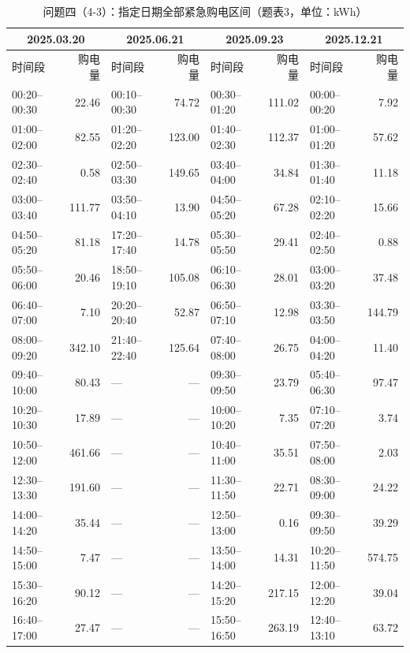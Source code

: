 \FloatBarrier
\begin{table}[H]
\centering\footnotesize
\setlength{\tabcolsep}{2.5pt}
\caption{问题四（4-3）：指定日期全部紧急购电区间（题表3，单位：kWh）}
\label{tab:required-q43-emergency}
\begin{tabular}{@{}lrlrlrlr@{}}
\toprule
\multicolumn{2}{c}{2025.03.20} & \multicolumn{2}{c}{2025.06.21} & \multicolumn{2}{c}{2025.09.23} & \multicolumn{2}{c}{2025.12.21} \\
\midrule
时间段 & 购电量 & 时间段 & 购电量 & 时间段 & 购电量 & 时间段 & 购电量 \\
\midrule
00:20--00:30 & 22.46 & 00:10--00:30 & 74.72 & 00:30--01:20 & 111.02 & 00:00--00:20 & 7.92 \\
01:00--02:00 & 82.55 & 01:20--02:20 & 123.00 & 01:40--02:30 & 112.37 & 01:00--01:20 & 57.62 \\
02:30--02:40 & 0.58 & 02:50--03:30 & 149.65 & 03:40--04:00 & 34.84 & 01:30--01:40 & 11.18 \\
03:00--03:40 & 111.77 & 03:50--04:10 & 13.90 & 04:50--05:20 & 67.28 & 02:10--02:20 & 15.66 \\
04:50--05:20 & 81.18 & 17:20--17:40 & 14.78 & 05:30--05:50 & 29.41 & 02:40--02:50 & 0.88 \\
05:50--06:00 & 20.46 & 18:50--19:10 & 105.08 & 06:10--06:30 & 28.01 & 03:00--03:20 & 37.48 \\
06:40--07:00 & 7.10 & 20:20--20:40 & 52.87 & 06:50--07:10 & 12.98 & 03:30--03:50 & 144.79 \\
08:00--09:20 & 342.10 & 21:40--22:40 & 125.64 & 07:40--08:00 & 26.75 & 04:00--04:20 & 11.40 \\
09:40--10:00 & 80.43 & — & — & 09:30--09:50 & 23.79 & 05:40--06:30 & 97.47 \\
10:20--10:30 & 17.89 & — & — & 10:00--10:20 & 7.35 & 07:10--07:20 & 3.74 \\
10:50--12:00 & 461.66 & — & — & 10:40--11:00 & 35.51 & 07:50--08:00 & 2.03 \\
12:30--13:30 & 191.60 & — & — & 11:30--11:50 & 22.71 & 08:30--09:00 & 24.22 \\
14:00--14:20 & 35.44 & — & — & 12:50--13:00 & 0.16 & 09:30--09:50 & 39.29 \\
14:50--15:00 & 7.47 & — & — & 13:50--14:00 & 14.31 & 10:20--11:50 & 574.75 \\
15:30--16:20 & 90.12 & — & — & 14:20--15:20 & 217.15 & 12:00--12:20 & 39.04 \\
16:40--17:00 & 27.47 & — & — & 15:50--16:50 & 263.19 & 12:40--13:10 & 63.72 \\

\end{tabular}
\end{table}
